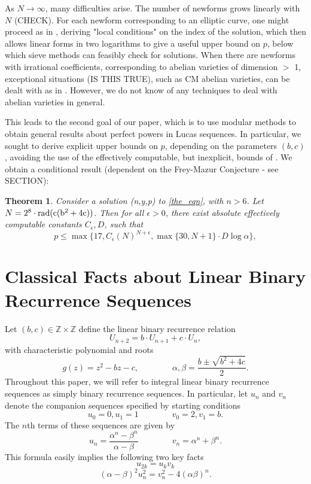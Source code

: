 \documentclass[12pt]{amsart}
\newtheorem{thm}{Theorem}[section]
\theoremstyle{definition}
\def\Z{{\mathbb Z}}
\newcommand{\rad}{\rm rad}
\begin{document}
As $N \to \infty$, many difficulties arise. The number of newforms grows linearly with $N$ (CHECK). For each newform corresponding to an elliptic curve, one might proceed as in \cite{siksek06}, deriving "local conditions" on the index of the solution, which then allows linear forms in two logarithms to give a useful upper bound on $p$, below which sieve methods can feasibly check for solutions. When there are newforms with irrational coefficients, corresponding to abelian varieties of dimension $>$ 1, exceptional situations (IS THIS TRUE), such as CM abelian varieties, can be dealt with as in \cite{bennett04}. However, we do not know of any techniques to deal with abelian varieties in general.

This leads to the second goal of our paper, which is to use modular methods to obtain general results about perfect powers in Lucas sequences. In particular, we sought to derive explicit upper bounds on $p$, depending on the parameters $(b,c)$, avoiding the use of the effectively computable, but inexplicit, bounds of \cite{petho82}\cite{shorey83}. We obtain a conditional result (dependent on the Frey-Mazur Conjecture - see SECTION):

\begin{thm}\label{condbound}
Consider a solution (n,y,p) to \eqref{the_eqn}, with $n > 6$. Let $N = 2^8 \cdot \rad(c(b^2+4c))$. Then for all $\epsilon > 0$, there exist absolute effectively computable constants $C_{\epsilon}, D$, such that
\[ p \leq \max\{17, C_{\epsilon} \left( N \right)^{N + \epsilon}, \max\{30, N+1\} \cdot D\log{\alpha} \}, \]

\end{thm}



\section{Classical Facts about Linear Binary Recurrence Sequences}


Let $(b,c) \in \Z \times \Z$ define the linear binary recurrence relation
\[ U_{n+2} = b\cdot U_{n+1}+ c\cdot U_n, \]
with characteristic polynomial and roots
\[ g(z) = z^2 - bz - c, \qquad \qquad \alpha, \beta = \frac{b \pm \sqrt{b^2+4c}}{2}.\]
Throughout this paper, we will refer to integral linear binary recurrence sequences as simply binary recurrence sequences.  In particular, let $u_n$ and $v_n$ denote the companion sequences specified by starting conditions
\[ u_0 = 0, u_1 = 1 \qquad \qquad v_0 = 2, v_1 = b .\]
The $n$th terms of these sequences are given by
\begin{equation}\label{binetform} u_n = \frac{\alpha^n - \beta^n}{\alpha - \beta} \qquad \qquad v_n = \alpha^n +\beta^n. \end{equation}
This formula easily implies the following two key facts
\begin{equation}\label{fib2} u_{2k} = u_kv_k \end{equation}
\begin{equation}\label{gen_diophan}(\alpha - \beta)^2u_n^2 = v_n^2 - 4(\alpha\beta)^n. \end{equation}
\end{document}
